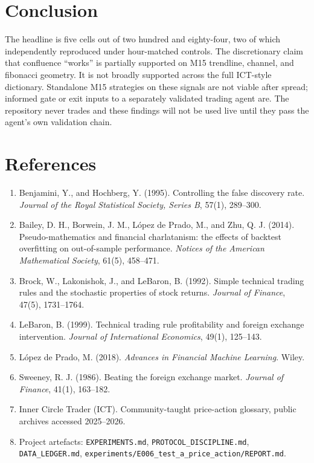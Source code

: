 \documentclass[11pt,a4paper]{article}
\begin{document}
\section{Conclusion}\label{sec:conclusion}

The headline is five cells out of two hundred and eighty-four, two of
which independently reproduced under hour-matched controls. The
discretionary claim that confluence \enquote{works} is partially
supported on M15 trendline, channel, and fibonacci geometry. It is not
broadly supported across the full ICT-style dictionary. Standalone M15
strategies on these signals are not viable after spread; informed gate
or exit inputs to a separately validated trading agent are. The
repository never trades and these findings will not be used live until
they pass the agent's own validation chain.

\section*{References}

\begin{enumerate}
  \item Benjamini, Y., and Hochberg, Y. (1995). Controlling the false
        discovery rate. \emph{Journal of the Royal Statistical Society,
        Series B}, 57(1), 289--300.
  \item Bailey, D. H., Borwein, J. M., L\'opez de Prado, M., and Zhu, Q. J.
        (2014). Pseudo-mathematics and financial charlatanism: the
        effects of backtest overfitting on out-of-sample performance.
        \emph{Notices of the American Mathematical Society}, 61(5),
        458--471.
  \item Brock, W., Lakonishok, J., and LeBaron, B. (1992). Simple
        technical trading rules and the stochastic properties of stock
        returns. \emph{Journal of Finance}, 47(5), 1731--1764.
  \item LeBaron, B. (1999). Technical trading rule profitability and
        foreign exchange intervention. \emph{Journal of International
        Economics}, 49(1), 125--143.
  \item L\'opez de Prado, M. (2018). \emph{Advances in Financial Machine
        Learning}. Wiley.
  \item Sweeney, R. J. (1986). Beating the foreign exchange market.
        \emph{Journal of Finance}, 41(1), 163--182.
  \item Inner Circle Trader (ICT). Community-taught price-action
        glossary, public archives accessed 2025--2026.
  \item Project artefacts:
        \texttt{EXPERIMENTS.md}, \texttt{PROTOCOL\_DISCIPLINE.md},
        \texttt{DATA\_LEDGER.md},
        \texttt{experiments/E006\_test\_a\_price\_action/REPORT.md}.
\end{enumerate}
\end{document}
